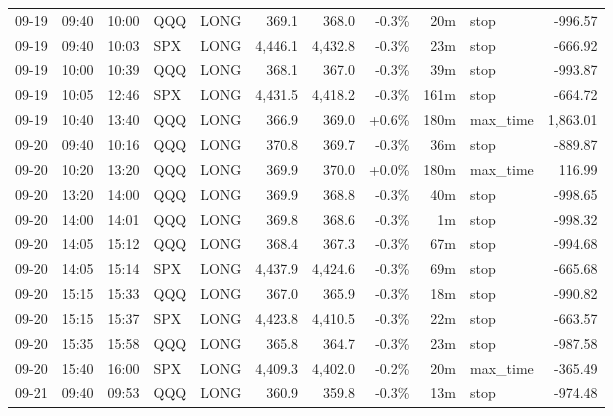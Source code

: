 \documentclass[11pt,a4paper,twoside]{article}
\begin{document}
\begin{center}
\begin{longtable}{>{\color{txtmain}}l l l l l r r r r >{\color{txtmain}}l r}
09-19 & 09:40 & 10:00 & QQQ & LONG & 369.1 & 368.0 & \textcolor{lossred}{-0.3\%} & 20m & stop & \textcolor{lossred}{-996.57} \\
09-19 & 09:40 & 10:03 & SPX & LONG & 4,446.1 & 4,432.8 & \textcolor{lossred}{-0.3\%} & 23m & stop & \textcolor{lossred}{-666.92} \\
09-19 & 10:00 & 10:39 & QQQ & LONG & 368.1 & 367.0 & \textcolor{lossred}{-0.3\%} & 39m & stop & \textcolor{lossred}{-993.87} \\
09-19 & 10:05 & 12:46 & SPX & LONG & 4,431.5 & 4,418.2 & \textcolor{lossred}{-0.3\%} & 161m & stop & \textcolor{lossred}{-664.72} \\
09-19 & 10:40 & 13:40 & QQQ & LONG & 366.9 & 369.0 & \textcolor{wingreen}{+0.6\%} & 180m & max\_time & \textcolor{wingreen}{1,863.01} \\
09-20 & 09:40 & 10:16 & QQQ & LONG & 370.8 & 369.7 & \textcolor{lossred}{-0.3\%} & 36m & stop & \textcolor{lossred}{-889.87} \\
09-20 & 10:20 & 13:20 & QQQ & LONG & 369.9 & 370.0 & \textcolor{wingreen}{+0.0\%} & 180m & max\_time & \textcolor{wingreen}{116.99} \\
09-20 & 13:20 & 14:00 & QQQ & LONG & 369.9 & 368.8 & \textcolor{lossred}{-0.3\%} & 40m & stop & \textcolor{lossred}{-998.65} \\
09-20 & 14:00 & 14:01 & QQQ & LONG & 369.8 & 368.6 & \textcolor{lossred}{-0.3\%} & 1m & stop & \textcolor{lossred}{-998.32} \\
09-20 & 14:05 & 15:12 & QQQ & LONG & 368.4 & 367.3 & \textcolor{lossred}{-0.3\%} & 67m & stop & \textcolor{lossred}{-994.68} \\
09-20 & 14:05 & 15:14 & SPX & LONG & 4,437.9 & 4,424.6 & \textcolor{lossred}{-0.3\%} & 69m & stop & \textcolor{lossred}{-665.68} \\
09-20 & 15:15 & 15:33 & QQQ & LONG & 367.0 & 365.9 & \textcolor{lossred}{-0.3\%} & 18m & stop & \textcolor{lossred}{-990.82} \\
09-20 & 15:15 & 15:37 & SPX & LONG & 4,423.8 & 4,410.5 & \textcolor{lossred}{-0.3\%} & 22m & stop & \textcolor{lossred}{-663.57} \\
09-20 & 15:35 & 15:58 & QQQ & LONG & 365.8 & 364.7 & \textcolor{lossred}{-0.3\%} & 23m & stop & \textcolor{lossred}{-987.58} \\
09-20 & 15:40 & 16:00 & SPX & LONG & 4,409.3 & 4,402.0 & \textcolor{lossred}{-0.2\%} & 20m & max\_time & \textcolor{lossred}{-365.49} \\
09-21 & 09:40 & 09:53 & QQQ & LONG & 360.9 & 359.8 & \textcolor{lossred}{-0.3\%} & 13m & stop & \textcolor{lossred}{-974.48} \\

\end{longtable}
\end{center}
\end{document}
